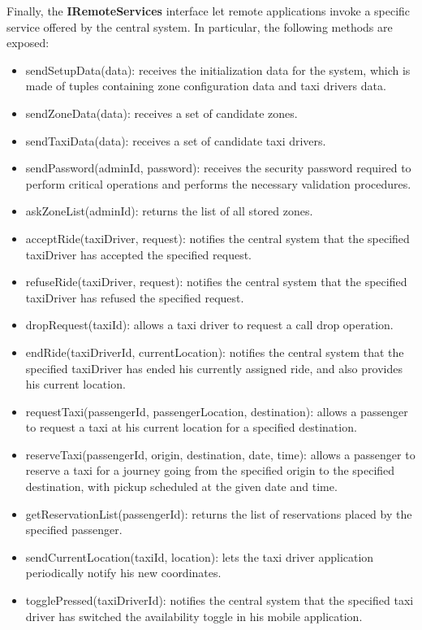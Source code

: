 Finally, the \textbf{IRemoteServices} interface let remote applications invoke a specific service offered by the central system. In particular, the following methods are exposed: 
\begin{itemize}
	\item sendSetupData(data): receives the initialization data for the system, which is made of tuples containing zone configuration data and taxi drivers data.
	\item sendZoneData(data): receives a set of candidate zones.
	\item sendTaxiData(data): receives a set of candidate taxi drivers.
	\item sendPassword(adminId, password): receives the security password required to perform critical operations and performs the necessary validation procedures.
	\item askZoneList(adminId): returns the list of all stored zones.
	\item acceptRide(taxiDriver, request): notifies the central system that the specified taxiDriver has accepted the specified request.
	\item refuseRide(taxiDriver, request): notifies the central system that the specified taxiDriver has refused the specified request.
	\item dropRequest(taxiId): allows a taxi driver to request a call drop operation.
	\item endRide(taxiDriverId, currentLocation): notifies the central system that the specified taxiDriver has ended his currently assigned ride, and also provides his current location.
	\item requestTaxi(passengerId, passengerLocation, destination): allows a passenger to request a taxi at his current location for a specified destination.
	\item reserveTaxi(passengerId, origin, destination, date, time): allows a passenger to reserve a taxi for a journey going from the specified origin to the specified destination, with pickup scheduled at the given date and time.
	\item getReservationList(passengerId): returns the list of reservations placed by the specified passenger.
	\item sendCurrentLocation(taxiId, location): lets the taxi driver application periodically notify his new coordinates.
	\item togglePressed(taxiDriverId): notifies the central system that the specified taxi driver has switched the availability toggle in his mobile application.
\end{itemize}

